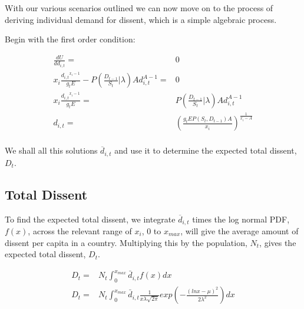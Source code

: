 \documentclass[12pt]{article}
\begin{document}
\begin{spacing}{1.5}
With our various scenarios outlined we can now move on to the process of deriving individual demand for dissent, which is a simple algebraic process. 

\vspace{1 em}
\noindent Begin with the first order condition: 

\begin{equation}
	\begin{aligned}
\frac{dU}{dd_{i,t}}=& 0\\ 
x_i \frac{{d_{i,t}}^{x_i -1}}{g_t E} - P\left(\frac{D_{t-1}}{S_t}\Big|\lambda \right)Ad_{i,t}^{A-1}=& 0 \\
	x_i \frac{{d_{i,t}}^{x_i -1}}{g_t E} =& P\left(\frac{D_{t-1}}{S_t}\Big|\lambda \right)Ad_{i,t}^{A-1}\\
		d_{i,t}=& \left(\frac{g_tEP(S_t,D_{t-1})A}{x_i} \right)^{\frac{1}{x_i -A}}\\ 	
	\end{aligned}
\end{equation}

We shall all this solutions $\overline{d}_{i,t}$ and use it to determine the expected total dissent, $D_t$. 

   
\subsection{Total Dissent}
 
To find the expected total dissent, we integrate $\overline{d}_{i,t}$ times the log normal PDF, $f(x)$, across the relevant range of $x_i$, $0$ to $x_{max}$, will give the average amount of dissent per capita in a country. Multiplying this by the population, $N_t$, gives the expected total dissent, $D_t$.

\begin{equation}
	\begin{aligned}
D_t=& N_t \int_{0}^{x_{max}} \bar{d}_{i,t} f(x) dx \\	
D_t	=& N_t \int_{0}^{x_{max}} \bar{d}_{i,t} \frac{1}{x\lambda \sqrt{2\pi}}exp  \left( -\frac{(lnx-\mu)^2}{2\lambda^2} \right)  dx \\	
	\end{aligned}
\end{equation}


\end{spacing}
\end{document}
